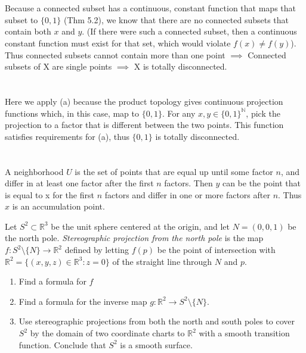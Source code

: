 \documentclass{jhwhw}
\newcommand{\R}{{\mathbb R}}
\newcommand{\N}{{\mathbb N}}
\begin{document}
\part{}%
Because a connected subset has a continuous, constant function that maps that subset to $\{0,1\}$ (Thm 5.2), we know that there are no connected subsets that contain both $x$ and $y$. (If there were such a connected subset, then a continuous constant function must exist for that set, which would violate $f(x)\neq f(y)$). Thus connected subsets cannot contain more than one point $\implies$ Connected subsets of X are single points $\implies$ X is totally disconnected.
\part{}%
Here we apply (a) because the product topology gives continuous projection functions which, in this case, map to $\{0,1\}$. For any $x,y\in \{0,1\}^\N$, pick the projection to a factor that is different between the two points. This function satisfies requirements for (a), thus $\{0,1\}$ is totally disconnected.
\part{}%
A neighborhood $U$ is the set of points that are equal up until some factor $n$, and differ in at least one factor after the first $n$ factors. Then $y$ can be the point that is equal to x for the first $n$ factors and differ in one or more factors after $n$. Thus $x$ is an accumulation point.

\problem{}%
Let $S^2\subset \mathbb{R}^3$ be the unit sphere centered at the origin, and  let $N = (0,0,1)$ be the north pole.  \emph{Stereographic  projection from the north pole} is the map   $f:S^2\setminus\{N\}\to\mathbb{R}^2$ defined by letting  $f(p)$ be the point of intersection with $\mathbb{R}^2 = \{(x,y,z)\in\mathbb{R}^3:z=0\}$ of the straight line through $N$ and $p$.  
\begin{enumerate}
	\item Find a formula for $f$
	\item Find a formula for the inverse map $g:\mathbb{R}^2\to S^2\setminus 
	\{N\}$. 
	\item
	Use stereographic projections from both the north and south poles to cover $S^2$ by the domain of two coordinate charts to $\R^2$ with a smooth transition function.  Conclude that $S^2$ is a smooth surface.
\end{enumerate} 
\end{document}
